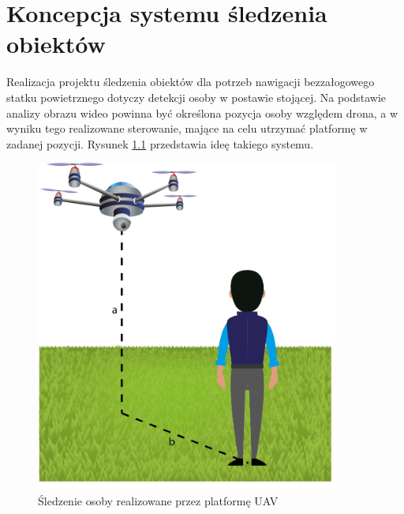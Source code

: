 \chapter{Koncepcja systemu śledzenia obiektów}
\label{sec:koncepcja}

Realizacja projektu śledzenia obiektów dla potrzeb nawigacji bezzałogowego statku powietrznego dotyczy detekcji osoby w postawie stojącej. Na podstawie analizy obrazu wideo powinna być określona pozycja osoby względem drona, a w wyniku tego realizowane sterowanie, mające na celu utrzymać platformę w zadanej pozycji. Rysunek \ref{fig:tracking_scheme} przedstawia ideę takiego systemu.
\begin{figure}[h]
	\centering
	\captionsetup{justification=centering,margin=1cm}
	\includegraphics[width=10cm]{tracking_scheme.png}
	\caption{Śledzenie osoby realizowane przez platformę UAV}
	\label{fig:tracking_scheme}
\end{figure}

